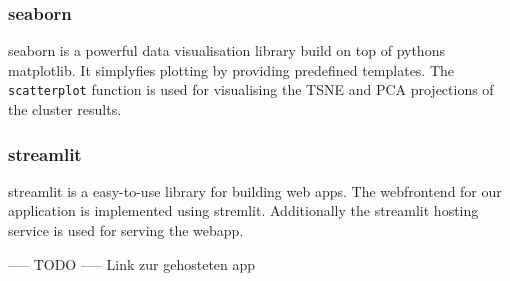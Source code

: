 \subsubsection{seaborn}
seaborn is a powerful data visualisation library build on top of pythons matplotlib. It simplyfies plotting by providing predefined templates. The \texttt{scatterplot} function is used for visualising the TSNE and PCA projections of the cluster results.

\subsubsection{streamlit}
streamlit is a easy-to-use library for building web apps. The webfrontend for our application is implemented using stremlit. Additionally the streamlit hosting service is used for serving the webapp.

----- TODO ----- Link zur gehosteten app
